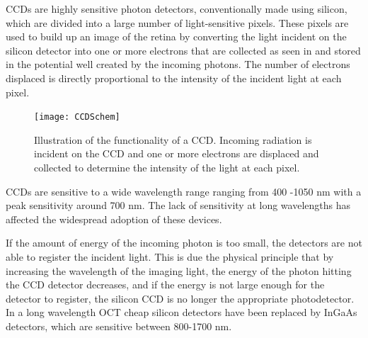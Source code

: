 CCDs are highly sensitive photon detectors, conventionally made using 
silicon, which are divided into a large number of light-sensitive pixels.  These 
pixels are used to build up an image of the retina by converting the light 
incident on the silicon detector into one or more electrons that are collected 
as seen in  and stored in the potential well created by the incoming 
photons. The number of electrons displaced is directly proportional to the 
intensity of the incident light at each pixel.

\begin{figure}[htbp]
\centering
\texttt{[image: CCDSchem]}
\caption{Illustration of the functionality of a CCD.  Incoming radiation is incident on
        the CCD and one or more electrons are displaced and collected to determine the
        intensity of the light at each pixel. \cite{poo1}}
\label{fig:CCD}
\end{figure}

CCDs are sensitive to a wide wavelength range ranging from 400 -1050 nm 
with a peak sensitivity around 700 nm. The lack of sensitivity at long wavelengths
has affected the widespread adoption of these devices. \cite{poo2} 
 
If the amount of energy of the incoming photon is too small, the detectors are 
not able to register the incident light. This is due the physical principle that by
increasing the wavelength of the imaging light, the energy of the photon hitting
the CCD detector decreases, and if the energy is not large enough for the
detector to register, the silicon CCD is no longer the appropriate photodetector. 
In a long wavelength OCT cheap silicon detectors have been replaced by 
InGaAs detectors, which are sensitive between 800-1700 nm.

